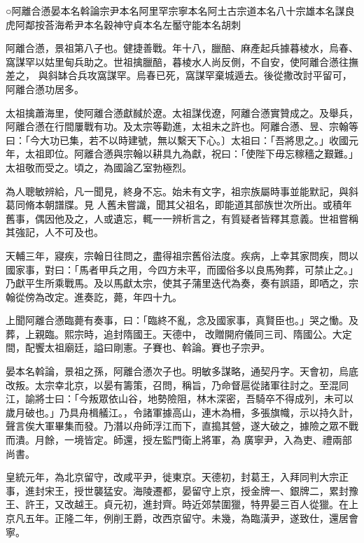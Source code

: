 
\begin{pinyinscope}

 ○阿離合懣晏本名斡論宗尹本名阿里罕宗寧本名阿土古宗道本名八十宗雄本名謀良虎阿鄰按荅海希尹本名穀神守貞本名左靨守能本名胡刺



 阿離合懣，景祖第八子也。健捷善戰。年十八，臘醅、麻產起兵據暮棱水，烏春、窩謀罕以姑里甸兵助之。世祖擒臘醅，暮棱水人尚反側，不自安，使阿離合懣往撫差之，
 與斜缽合兵攻窩謀罕。烏春已死，窩謀罕棄城遁去。後從撒改討平留可，阿離合懣功居多。



 太祖擒蕭海里，使阿離合懣獻馘於遼。太祖謀伐遼，阿離合懣實贊成之。及舉兵，阿離合懣在行間屢戰有功。及太宗等勸進，太祖未之許也。阿離合懣、昱、宗翰等曰：「今大功已集，若不以時建號，無以繫天下心。〕太祖曰：「吾將思之。」收國元年，太祖即位。阿離合懣與宗翰以耕具九為獻，祝曰：「使陛下毋忘稼穡之艱難。」太祖敬而受之。頃之，為國論乙室勃極烈。



 為人聰敏辨給，凡一聞見，終身不忘。始未有文字，祖宗族屬時事並能默記，與斜葛同脩本朝譜牒。見
 人舊未嘗識，聞其父祖名，即能道其部族世次所出。或積年舊事，偶因他及之，人或遺忘，輒一一辨析言之，有質疑者皆釋其意義。世祖嘗稱其強記，人不可及也。



 天輔三年，寢疾，宗翰日往問之，盡得祖宗舊俗法度。疾病，上幸其家問疾，問以國家事，對曰：「馬者甲兵之用，今四方未平，而國俗多以良馬殉葬，可禁止之。」乃獻平生所乘戰馬。及以馬獻太宗，使其子蒲里迭代為奏，奏有誤語，即哂之，宗翰從傍為改定。進奏訖，薨，年四十九。



 上聞阿離合懣臨薨有奏事，曰：「臨終不亂，念及國家事，真賢臣也。」哭之慟。及葬，上親臨。熙宗時，追封隋國王。天德中，
 改贈開府儀同三司、隋國公。大定間，配饗太祖廟廷，謚曰剛憲。子賽也、斡論。賽也子宗尹。



 晏本名斡論，景祖之孫，阿離合懣次子也。明敏多謀略，通契丹字。天會初，烏底改叛。太宗幸北京，以晏有籌策，召問，稱旨，乃命督扈從諸軍往討之。至混同江，諭將士曰：「今叛眾依山谷，地勢險阻，林木深密，吾騎卒不得成列，未可以歲月破也。」乃具舟楫艤江。，令諸軍據高山，連木為柵，多張旗幟，示以持久計，聲言俟大軍畢集而發。乃潛以舟師浮江而下，直搗其營，遂大破之，據險之眾不戰而潰。月餘，一境皆定。師還，授左監門衛上將軍，為
 廣寧尹，入為吏、禮兩部尚書。



 皇統元年，為北京留守，改咸平尹，徙東京。天德初，封葛王，入拜同判大宗正事，進封宋王，授世襲猛安。海陵遷都，晏留守上京，授金牌一、銀牌二，累封豫王、許王，又改越王。貞元初，進封齊。時近郊禁圍獵，特畀晏三百人從獵。在上京凡五年。正隆二年，例削王爵，改西京留守。未幾，為臨潢尹，遂致仕，還居會寧。




\end{pinyinscope}
